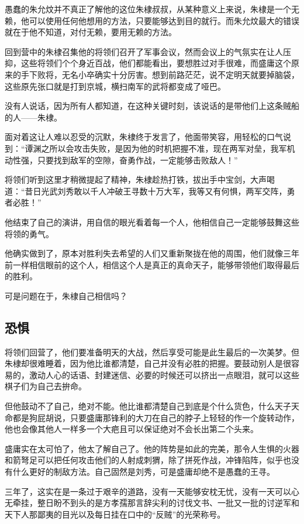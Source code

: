\begin{multicols}{\theparacolNo}
		愚蠢的朱允炆并不真正了解他的这位朱棣叔叔，从某种意义上来说，朱棣是一个无赖，他可以使用任何他想用的方法，只要能够达到目的就行。而朱允炆最大的错误就在于他不知道，对付无赖，要用无赖的方法。

		回到营中的朱棣召集他的将领们召开了军事会议，然而会议上的气氛实在让人压抑，这些将领们个个身近百战，他们都能看出，要想胜过对手很难，而盛庸这个原来的手下败将，无名小卒确实十分厉害。想到前路茫茫，说不定明天就要掉脑袋，这些原先张口就是打到京城，横扫南军的武将都变成了哑巴。

		没有人说话，因为所有人都知道，在这种关键时刻，该说话的是带他们上这条贼船的人——朱棣。

		面对着这让人难以忍受的沉默，朱棣终于发言了，他面带笑容，用轻松的口气说到：“谭渊之所以会攻击失败，是因为他的时机把握不准，现在两军对垒，我军机动性强，只要找到敌军的空隙，奋勇作战，一定能够击败敌人！”

		将领们听到这里才稍微提起了精神，朱棣趁热打铁，拔出手中宝剑，大声喝道：“昔日光武刘秀敢以千人冲破王寻数十万大军，我等又有何惧，两军交阵，勇者必胜！”

		他结束了自己的演讲，用自信的眼光看着每一个人，他相信自己一定能够鼓舞这些将领的勇气。

		他确实做到了，原本对胜利失去希望的人们又重新聚拢在他的周围，他们就像三年前一样相信眼前的这个人，相信这个人是真正的真命天子，能够带领他们取得最后的胜利。

		可是问题在于，朱棣自己相信吗？

		\subsection{恐惧}
		将领们回营了，他们要准备明天的大战，然后享受可能是此生最后的一次美梦。但朱棣却很难睡着，因为他比谁都清楚，自己并没有必胜的把握。要鼓动别人是很容易的，激动人心的话语、封建迷信、必要的时候还可以挤出一点眼泪，就可以这些棋子们为自己去拚命。

		但他鼓动不了自己，绝对不能。他比谁都清楚自己到底是个什么货色，什么天子天命都是狗屁胡说，只要盛庸那锋利的大刀在自己的脖子上轻轻的作一个旋转动作，他也会像其他人一样多一个大疤且可以保证绝对不会长出第二个头来。

		盛庸实在太可怕了，他太了解自己了。他的阵势是如此的完美，那令人生惧的火器和箭弩足可以把任何攻击他们的人射成刺猬，除了拼死作战，冲锋陷阵，似乎也没有什么更好的制敌方法。自己固然是刘秀，可是盛庸却绝不是愚蠢的王寻。

		三年了，这实在是一条过于艰辛的道路，没有一天能够安枕无忧，没有一天可以心无牵挂，整日盼不到头的是方孝孺那言辞尖利的讨伐文书、一批又一批的讨逆军和天下人那鄙夷的目光以及每日挂在口中的“反贼”的光荣称号。


\end{multicols}
